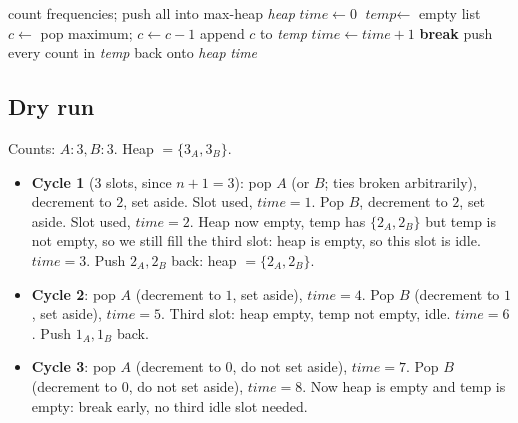 \begin{algorithm}[H]
\caption{Task Scheduler}
\begin{algorithmic}[1]
  \State count frequencies; push all into max-heap \textit{heap}
  \State $\textit{time} \gets 0$
    \State $\textit{temp} \gets$ empty list
        \State $c \gets$ pop maximum; $c \gets c - 1$
         append $c$ to \textit{temp} \EndIf
      \EndIf
      \State $\textit{time} \gets \textit{time} + 1$
        \State \textbf{break}
      \EndIf
    \EndFor
    \State push every count in \textit{temp} back onto \textit{heap}
  \EndWhile
  \State \Return \textit{time}
\EndProcedure
\end{algorithmic}
\end{algorithm}

\subsection*{Dry run}


Counts: $A{:}3, B{:}3$. Heap $=\{3_A, 3_B\}$.

\begin{itemize}
  \item \textbf{Cycle 1} ($3$ slots, since $n+1=3$): pop $A$ (or $B$;
        ties broken arbitrarily), decrement to $2$, set aside. Slot
        used, $\textit{time}=1$. Pop $B$, decrement to $2$, set aside.
        Slot used, $\textit{time}=2$. Heap now empty, temp has
        $\{2_A, 2_B\}$ but temp is not empty, so we still fill the third
        slot: heap is empty, so this slot is idle. $\textit{time}=3$.
        Push $2_A, 2_B$ back: heap $=\{2_A, 2_B\}$.
  \item \textbf{Cycle 2}: pop $A$ (decrement to $1$, set aside),
        $\textit{time}=4$. Pop $B$ (decrement to $1$, set aside),
        $\textit{time}=5$. Third slot: heap empty, temp not empty, idle.
        $\textit{time}=6$. Push $1_A, 1_B$ back.
  \item \textbf{Cycle 3}: pop $A$ (decrement to $0$, do not set aside),
        $\textit{time}=7$. Pop $B$ (decrement to $0$, do not set aside),
        $\textit{time}=8$. Now heap is empty and temp is empty: break
        early, no third idle slot needed.
\end{itemize}

